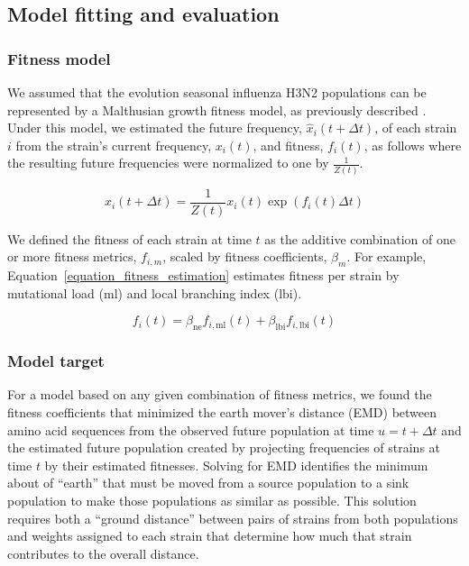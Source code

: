 \subsection*{Model fitting and evaluation}

\subsubsection*{Fitness model}

We assumed that the evolution seasonal influenza H3N2 populations can be represented by a Malthusian growth fitness model, as previously described \citep{Luksza:2014hj}.
Under this model, we estimated the future frequency, $\hat{x}_{i}(t + \Delta{t})$, of each strain $i$ from the strain's current frequency, $x_{i}(t)$, and fitness, $f_{i}(t)$, as follows where the resulting future frequencies were normalized to one by $\frac{1}{Z(t)}$.

\begin{equation}
    \hat{x}_{i}(t + \Delta{t}) = \frac{1}{Z(t)}x_{i}(t)\exp(f_{i}(t)\Delta{t})
    \label{equation_exponential_growth_model}
\end{equation}

We defined the fitness of each strain at time $t$ as the additive combination of one or more fitness metrics, $f_{i,m}$, scaled by fitness coefficients, $\beta_{m}$.
For example, Equation~\ref{equation_fitness_estimation} estimates fitness per strain by mutational load ($\mathrm{ml}$) and local branching index ($\mathrm{lbi}$).

\begin{equation}
    f_{i}(t) = \beta_{\mathrm{ne}}f_{i, \mathrm{ml}}(t) + \beta_{\mathrm{lbi}}f_{i, \mathrm{lbi}}(t)
    \label{equation_fitness_estimation}
\end{equation}

\subsubsection*{Model target}

For a model based on any given combination of fitness metrics, we found the fitness coefficients that minimized the earth mover's distance (EMD) \citep{Rubner1998,Kusner2015} between amino acid sequences from the observed future population at time $u = t + \Delta{t}$ and the estimated future population created by projecting frequencies of strains at time $t$ by their estimated fitnesses.
Solving for EMD identifies the minimum about of ``earth'' that must be moved from a source population to a sink population to make those populations as similar as possible.
This solution requires both a ``ground distance'' between pairs of strains from both populations and weights assigned to each strain that determine how much that strain contributes to the overall distance.

